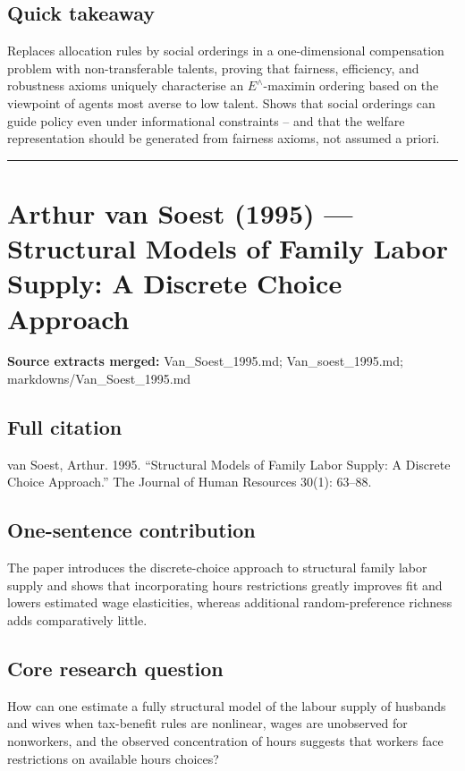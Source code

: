 \documentclass[11pt,a4paper]{article}
\begin{document}
\subsection*{Quick takeaway}
Replaces allocation rules by social orderings in a one-dimensional compensation problem with non-transferable talents, proving that fairness, efficiency, and robustness axioms uniquely characterise an $E^{\wedge}$-maximin ordering based on the viewpoint of agents most averse to low talent. Shows that social orderings can guide policy even under informational constraints -- and that the welfare representation should be generated from fairness axioms, not assumed a priori.


\medskip\hrule\medskip

\section*{Arthur van Soest (1995) — Structural Models of Family Labor Supply: A Discrete Choice Approach}

\textbf{Source extracts merged:} Van\_Soest\_1995.md; Van\_soest\_1995.md; markdowns/Van\_Soest\_1995.md

\subsection*{Full citation}
van Soest, Arthur. 1995. “Structural Models of Family Labor Supply: A Discrete Choice Approach.” The Journal of Human Resources 30(1): 63–88.

\subsection*{One-sentence contribution}
The paper introduces the discrete-choice approach to structural family labor supply and shows that incorporating hours restrictions greatly improves fit and lowers estimated wage elasticities, whereas additional random-preference richness adds comparatively little.

\subsection*{Core research question}
How can one estimate a fully structural model of the labour supply of husbands and wives when tax-benefit rules are nonlinear, wages are unobserved for nonworkers, and the observed concentration of hours suggests that workers face restrictions on available hours choices?
\end{document}
